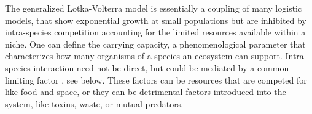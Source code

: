 \documentclass[a4paper,10pt]{article}
\numberwithin{equation}{section} %
\begin{document}
The generalized Lotka-Volterra model is essentially a coupling of many logistic models, that show exponential growth at small populations but are inhibited by intra-species competition accounting for the limited resources available within a niche. 
One can define the carrying capacity, a phenomenological parameter that characterizes how many organisms of a species an ecosystem can support. 
Intra-species interaction need not be direct, but could be mediated by a common limiting factor \cite{McGehee1977a}, see below. 
These factors can be resources that are competed for like food and space, or they can be detrimental factors introduced into the system, like toxins, waste, or mutual predators. 
\end{document}
